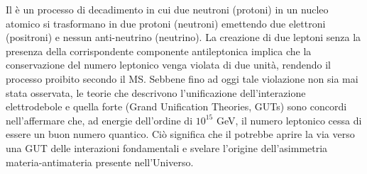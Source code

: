 Il \doppiobeta{} è un processo di decadimento in cui due neutroni (protoni) in un nucleo atomico si trasformano in due protoni (neutroni) emettendo due elettroni (positroni) e nessun anti-neutrino (neutrino).
La creazione di due leptoni senza la presenza della corrispondente componente antileptonica implica che la conservazione del numero leptonico venga violata di due unità, rendendo il processo proibito secondo il MS. 
Sebbene fino ad oggi tale violazione non sia mai stata osservata, le teorie che descrivono l'unificazione dell'interazione elettrodebole e quella forte (Grand Unification Theories, GUTs) sono concordi nell'affermare che, ad energie dell'ordine di $10^{15}$ GeV, il numero leptonico cessa di essere un buon numero quantico\cite{pirro:epja06}. 
Ciò significa che il \doppiobeta{} potrebbe aprire la via verso una GUT delle interazioni fondamentali e svelare l'origine dell'asimmetria materia-antimateria presente nell'Universo\cite{vergados:ijmpe16}.

